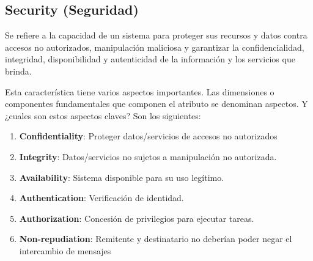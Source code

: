 \documentclass{article}
\begin{document}
		
		\subsection{Security \small{(Seguridad)}}
		Se refiere a la capacidad de un sistema para proteger sus recursos y datos contra accesos no autorizados, manipulación maliciosa y garantizar la confidencialidad, integridad, disponibilidad y autenticidad de la información y los servicios que brinda.
		
		Esta característica tiene varios aspectos importantes. Las dimensiones o componentes fundamentales que componen el atributo se denominan aspectos. Y ¿cuales son estos aspectos claves? Son los siguientes: 
			\begin{enumerate}
			\item \textbf{Confidentiality}: Proteger datos/servicios de accesos
			no autorizados
			
			\item \textbf{Integrity}: Datos/servicios no sujetos a manipulación no autorizada.
			
			\item \textbf{Availability}: Sistema disponible para su uso legítimo.
			
			\item \textbf{Authentication}: Verificación de identidad.
			
			\item \textbf{Authorization}: Concesión de privilegios para ejecutar tareas.
			
			\item \textbf{Non-repudiation}: Remitente y destinatario no	deberían poder negar el intercambio de mensajes			
			
		\end{enumerate}	
\end{document}

